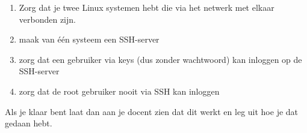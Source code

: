 \begin{enumerate}
\item Zorg dat je twee Linux systemen hebt die via het netwerk met elkaar verbonden zijn.
\item maak van \'e\'en systeem een SSH-server
\item zorg dat een gebruiker via keys (dus zonder wachtwoord) kan inloggen op de SSH-server
\item zorg dat de root gebruiker nooit via SSH kan inloggen
\end{enumerate}

Als je klaar bent laat dan aan je docent zien dat dit werkt en leg uit hoe je dat gedaan hebt.


